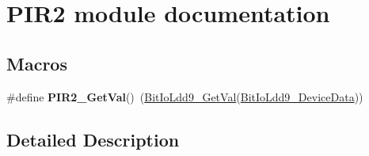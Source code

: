 \hypertarget{group___p_i_r2__module}{\section{P\-I\-R2 module documentation}
\label{group___p_i_r2__module}
}
\subsection*{Macros}
\begin{DoxyCompactItemize}
\item 
\hypertarget{group___p_i_r2__module_gacf12564c0ec74a1b0601cce856f61aca}{\#define {\bfseries P\-I\-R2\-\_\-\-Get\-Val}()~(\hyperlink{group___bit_io_ldd9__module_gaebd043c61a2e886b4b8961e0932f25be}{Bit\-Io\-Ldd9\-\_\-\-Get\-Val}(\hyperlink{group___bit_io_ldd9__module_ga597e971eb96d12469036edb9403f1391}{Bit\-Io\-Ldd9\-\_\-\-Device\-Data}))}\label{group___p_i_r2__module_gacf12564c0ec74a1b0601cce856f61aca}

\end{DoxyCompactItemize}


\subsection{Detailed Description}
